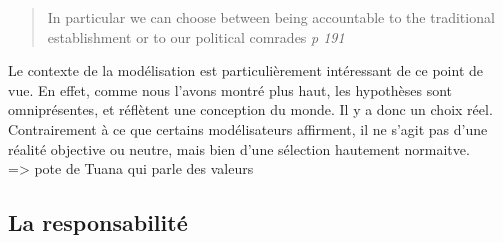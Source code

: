 \begin{quote}
    In particular we can choose between being accountable to the traditional establishment or to our political comrades \textit{p 191}
\end{quote}

Le contexte de la modélisation est particulièrement intéressant de ce point de vue. En effet, comme nous l'avons montré plus haut, les hypothèses sont omniprésentes, et réflètent une conception du monde. Il y a donc un choix réel. Contrairement à ce que certains modélisateurs affirment, il ne s'agit pas d'une réalité objective ou neutre, mais bien d'une sélection hautement normaitve. \\




\cite{helgeson_attention_2022} => pote de Tuana qui parle des valeurs

\subsection{La responsabilité}




